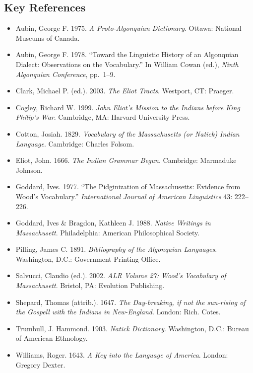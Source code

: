 \subsection{Key References}

\begin{itemize}
  \item Aubin, George F. 1975. \emph{A Proto-Algonquian Dictionary}. Ottawa:
    National Museums of Canada.
  \item Aubin, George F. 1978. ``Toward the Linguistic History of an Algonquian
    Dialect: Observations on the Vocabulary.'' In William Cowan (ed.),
    \emph{Ninth Algonquian Conference}, pp.\ 1--9.
  \item Clark, Michael P. (ed.). 2003. \emph{The Eliot Tracts}. Westport, CT:
    Praeger.
  \item Cogley, Richard W. 1999. \emph{John Eliot's Mission to the Indians
    before King Philip's War}. Cambridge, MA: Harvard University Press.
  \item Cotton, Josiah. 1829. \emph{Vocabulary of the Massachusetts (or Natick)
    Indian Language}. Cambridge: Charles Folsom.
  \item Eliot, John. 1666. \emph{The Indian Grammar Begun}. Cambridge:
    Marmaduke Johnson.
  \item Goddard, Ives. 1977. ``The Pidginization of Massachusetts: Evidence
    from Wood's Vocabulary.'' \emph{International Journal of American
    Linguistics} 43: 222--226.
  \item Goddard, Ives \& Bragdon, Kathleen J. 1988. \emph{Native Writings in
    Massachusett}. Philadelphia: American Philosophical Society.
  \item Pilling, James C. 1891. \emph{Bibliography of the Algonquian Languages}.
    Washington, D.C.: Government Printing Office.
  \item Salvucci, Claudio (ed.). 2002. \emph{ALR Volume 27: Wood's Vocabulary of
    Massachusett}. Bristol, PA: Evolution Publishing.
  \item Shepard, Thomas (attrib.). 1647. \emph{The Day-breaking, if not the
    sun-rising of the Gospell with the Indians in New-England}. London: Rich.
    Cotes.
  \item Trumbull, J. Hammond. 1903. \emph{Natick Dictionary}. Washington, D.C.:
    Bureau of American Ethnology.
  \item Williams, Roger. 1643. \emph{A Key into the Language of America}.
    London: Gregory Dexter.
\end{itemize}
